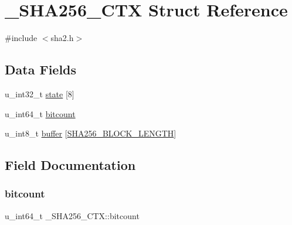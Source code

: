 \hypertarget{struct__SHA256__CTX}{}\section{\+\_\+\+S\+H\+A256\+\_\+\+C\+TX Struct Reference}
\label{struct__SHA256__CTX}


{\ttfamily \#include $<$sha2.\+h$>$}

\subsection*{Data Fields}
\begin{DoxyCompactItemize}
\item 
u\+\_\+int32\+\_\+t \mbox{\hyperlink{struct__SHA256__CTX_a8d0de581b0873919d65864ad0df17ad5}{state}} \mbox{[}8\mbox{]}
\item 
u\+\_\+int64\+\_\+t \mbox{\hyperlink{struct__SHA256__CTX_ab21624f45e0f59b135bfae6344fd5741}{bitcount}}
\item 
u\+\_\+int8\+\_\+t \mbox{\hyperlink{struct__SHA256__CTX_a368a72711aeaff92f51237ecbb98ce17}{buffer}} \mbox{[}\mbox{\hyperlink{sha2_8h_af7a1879c2d7cd5cf31c91c0eb91b0015}{S\+H\+A256\+\_\+\+B\+L\+O\+C\+K\+\_\+\+L\+E\+N\+G\+TH}}\mbox{]}
\end{DoxyCompactItemize}


\subsection{Field Documentation}
\mbox{\label{struct__SHA256__CTX_ab21624f45e0f59b135bfae6344fd5741}} 
\subsubsection{\texorpdfstring{bitcount}{bitcount}}
{\footnotesize\ttfamily u\+\_\+int64\+\_\+t \+\_\+\+S\+H\+A256\+\_\+\+C\+T\+X\+::bitcount}

\mbox{\label{struct__SHA256__CTX_a368a72711aeaff92f51237ecbb98ce17}} 
